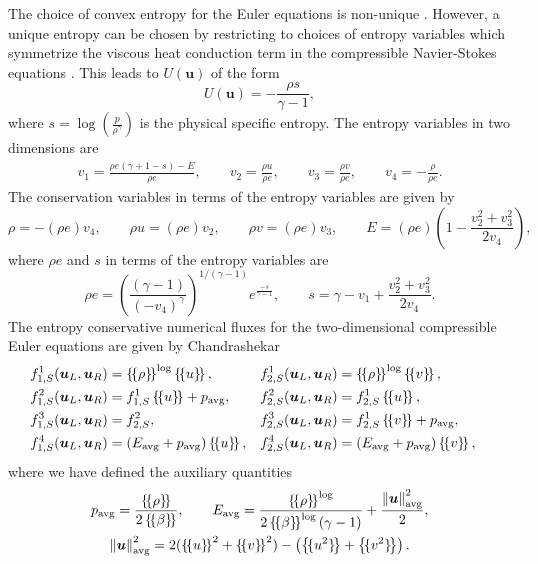 \documentclass[preprint,10pt]{article}
\theoremstyle{definition}
\theoremstyle{lemma}
\theoremstyle{theorem}
\theoremstyle{assumption}
\newcommand{\nor}[1]{\left\| #1 \right\|}
\newcommand{\LRp}[1]{\left( #1 \right)}
\newcommand{\LRc}[1]{\left\{ #1 \right\}}
\newcommand{\avg}[1] {\ensuremath{\LRc{\!\{#1\}\!}}}
\begin{document}
{The choice of convex entropy for the Euler equations is non-unique \cite{harten1983symmetric}.  However, a unique entropy can be chosen by restricting to choices of entropy variables which symmetrize the viscous heat conduction term in the compressible Navier-Stokes equations \cite{hughes1986new}.  This leads to $U(\bm{u})$ of the form
\begin{equation}
U(\bm{u}) = -\frac{\rho s}{\gamma-1},
\label{eq:entropy2d}
\end{equation}
where $s = \log\LRp{\frac{p}{\rho^\gamma}}$ is the physical specific entropy. The entropy variables in two dimensions are 
\begin{align}
v_1 = \frac{\rho e (\gamma + 1 - s) - E}{\rho e}, \qquad v_2 = \frac{\rho u}{\rho e}, \qquad v_3 = \frac{\rho v}{\rho e}, \qquad v_4 = -\frac{\rho}{\rho e}.
\end{align}
The conservation variables in terms of the entropy variables are given by
\begin{equation}
\rho = -(\rho e) v_4, \qquad \rho u = (\rho e) v_2, \qquad \rho v = (\rho e) v_3, \qquad E = (\rho e)\LRp{1 - \frac{{v_2^2+v_3^2}}{2 v_4}},
\end{equation}
where $\rho e$ and $s$ in terms of the entropy variables are 
\begin{equation}
\rho e = \LRp{\frac{(\gamma-1)}{\LRp{-v_4}^{\gamma}}}^{1/(\gamma-1)}e^{\frac{-s}{\gamma-1}}, \qquad s = \gamma - v_1 + \frac{{v_2^2+v_3^2}}{2v_4}.
\end{equation}
The entropy conservative numerical fluxes for the two-dimensional compressible Euler equations are given by Chandrashekar \cite{chandrashekar2013kinetic}
\begin{align}
&f^1_{1,S}(\bm{u}_L,\bm{u}_R) = \avg{\rho}^{\log} \avg{u},& &f^1_{2,S}(\bm{u}_L,\bm{u}_R) = \avg{\rho}^{\log} \avg{v},&\\
&f^2_{1,S}(\bm{u}_L,\bm{u}_R) = f^1_{1,S} \avg{u} + p_{\rm avg},&  &f^2_{2,S}(\bm{u}_L,\bm{u}_R) = f^1_{2,S} \avg{u},&\nonumber\\
&f^3_{1,S}(\bm{u}_L,\bm{u}_R) = f^2_{2,S},& &f^3_{2,S}(\bm{u}_L,\bm{u}_R) = f^1_{2,S} \avg{v} + p_{\rm avg},&\nonumber\\
&f^4_{1,S}(\bm{u}_L,\bm{u}_R) = \LRp{E_{\rm avg} + p_{\rm avg}}\avg{u},& &f^4_{2,S}(\bm{u}_L,\bm{u}_R) = \LRp{E_{\rm avg} + p_{\rm avg} }\avg{v},& \nonumber
\end{align}
where we have defined the auxiliary quantities 
\begin{gather}
p_{\rm avg} = \frac{\avg{\rho}}{2\avg{\beta}}, \qquad E_{\rm avg} = \frac{\avg{\rho}^{\log}}{2\avg{\beta}^{\log}\LRp{\gamma -1}}   + \frac{\nor{\bm{u}}^2_{\rm avg}}{2}, \\
 \nor{\bm{u}}^2_{\rm avg} = 2(\avg{u}^2 + \avg{v}^2) - \LRp{\avg{u^2} +\avg{v^2}} \nonumber.  
\end{gather}

}
\end{document}
